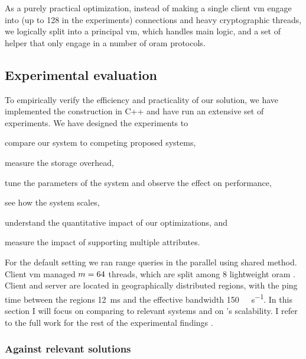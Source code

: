 				As a purely practical optimization, instead of making a single client \acrshort{vm} engage into \oramsNumber{} (up to 128 in the experiments) connections and heavy cryptographic threads, we logically split \user{} into a principal \acrshort{vm}, which handles main logic, and a set of helper  that only engage in a number of \acrshort{oram} protocols.

				

		\subsection{Experimental evaluation}

			To empirically verify the efficiency and practicality of our solution, we have implemented the construction in C++ \cite{github-epsolute} and have run an extensive set of experiments.
			We have designed the experiments to
			\begin{enumerate*}[label=(\alph*)] %
				\item compare our system to competing proposed systems,
				\item measure the storage overhead,
				\item tune the parameters of the system and observe the effect on performance,
				\item see how the system scales,
				\item understand the quantitative impact of our optimizations, and
				\item measure the impact of supporting multiple attributes.
			\end{enumerate*}

			For the default setting we ran range queries in the parallel \epsolute{} using shared \serverDS{} method.
			Client \acrshort{vm} managed $m = 64$ threads, which are split among 8 lightweight \acrshort{oram} .
			Client \user{} and server \server{} are located in geographically distributed regions, with the ping time between the regions \SI{12}{\milli\second} and the effective bandwidth \SI{150}{\mega\byte\per\second}.
			In this section I will focus on comparing \epsolute{} to relevant systems and on \epsolute{}'s scalability.
			I refer to the full work for the rest of the experimental findings \cite[Section 6]{epsolute}.

			\subsubsection{Against relevant solutions}

